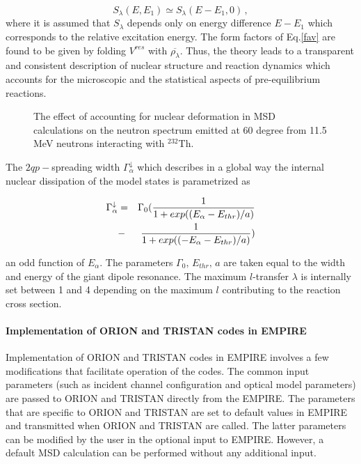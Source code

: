 \begin{equation}
S_{\lambda}(E,E_{1})\simeq S_{\lambda}(E-E_{1},0)\,,  \label{slrpa}
\end{equation}
\noindent where it is assumed that $S_{\lambda}$ depends only on energy
difference $E-E_{1}$ which corresponds to the relative excitation energy.
The form factors of Eq.\ref{fav} are found to be given by folding $V^{res}$
with $%
\overline{\rho_{\lambda}}$. Thus, the theory leads to a transparent and
consistent description of nuclear structure and reaction dynamics which
accounts for the microscopic and the statistical aspects of pre-equilibrium
reactions.

\begin{figure}[htbp]
\caption{The effect of accounting for nuclear deformation in MSD
calculations on the neutron spectrum emitted at 60 degree from 11.5 MeV
neutrons interacting with $^{232}$Th.}
\label{fig:Th-defMSD}
\end{figure}

The $2qp-$spreading width $\Gamma_{\alpha}^{\downarrow}$ which describes in
a global way the internal nuclear dissipation of the model states is
parametrized as

\begin{eqnarray}
\Gamma_{\alpha}^{\downarrow}&=&\Gamma_{0}(\frac{1}{1+exp((E_{%
\alpha}-E_{thr})/a)}  \nonumber \\
&-&\frac{1}{1+exp((-E_{\alpha}-E_{thr})/a)})
\end{eqnarray}

\noindent an odd function of $E_{\alpha}$. The parameters $\Gamma_{0},\,
E_{thr},\, a$ are taken equal to the width and energy of the giant dipole
resonance. The maximum $l$-transfer $\lambda$ is internally set between 1
and 4 depending on the maximum $l$ contributing to the reaction cross
section.

\paragraph{Implementation of ORION and TRISTAN%
 codes in EMPIRE}

Implementation of ORION%
 and TRISTAN codes in EMPIRE involves a few modifications that
facilitate operation of the codes. The common input parameters (such as
incident channel configuration and optical model parameters) are passed to
ORION and TRISTAN directly from the EMPIRE. The parameters that are specific
to ORION and TRISTAN are set to default values in EMPIRE and transmitted
when ORION and TRISTAN are called. The latter parameters can be modified by
the user in the optional input to EMPIRE. However, a default MSD%
 calculation can be performed without any additional input.

